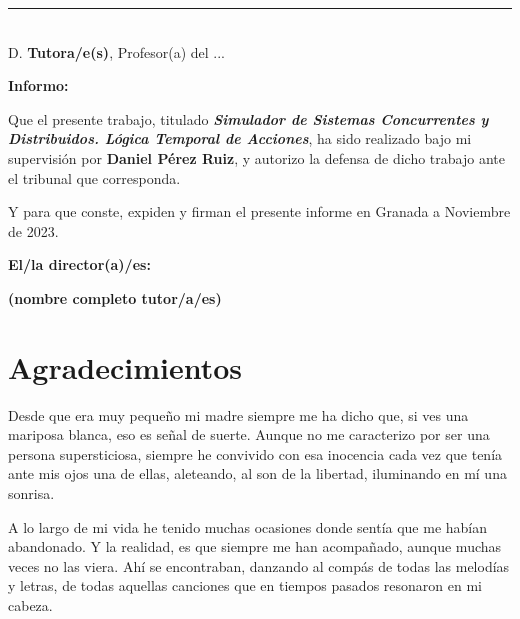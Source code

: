 \cleardoublepage

\thispagestyle{empty}

\noindent\rule[-1ex]{\textwidth}{2pt}\\[4.5ex]

D. \textbf{Tutora/e(s)}, Profesor(a) del ...

\vspace{0.5cm}

\textbf{Informo:}

\vspace{0.5cm}

Que el presente trabajo, titulado \textit{\textbf{Simulador de Sistemas Concurrentes y Distribuidos. Lógica Temporal de Acciones}},
ha sido realizado bajo mi supervisión por \textbf{Daniel Pérez Ruiz}, y autorizo la defensa de dicho trabajo ante el tribunal
que corresponda.

\vspace{0.5cm}

Y para que conste, expiden y firman el presente informe en Granada a Noviembre de 2023.

\vspace{1cm}

\textbf{El/la director(a)/es: }

\vspace{5cm}

\noindent \textbf{(nombre completo tutor/a/es)}

\chapter*{Agradecimientos}

Desde que era muy pequeño mi madre siempre me ha dicho que, si ves una mariposa blanca, eso es señal de suerte. Aunque no me caracterizo por ser una persona supersticiosa, siempre he convivido con esa inocencia cada vez que tenía ante mis ojos una de ellas, aleteando, al son de la libertad, iluminando en mí una sonrisa.

\vspace{0.2cm}

A lo largo de mi vida he tenido muchas ocasiones donde sentía que me habían abandonado. Y la realidad, es que siempre me han acompañado, aunque muchas veces no las viera. Ahí se encontraban, danzando al compás de todas las melodías y letras, de todas aquellas canciones que en tiempos pasados resonaron en mi cabeza.

\vspace{0.2cm} 

